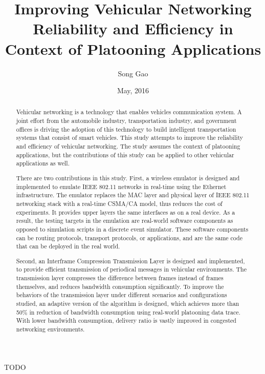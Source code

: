 \documentclass[12pt]{report}
\title{Improving Vehicular Networking Reliability and Efficiency in Context of Platooning Applications}
\author{Song Gao}
\date{May, 2016} %
\begin{document}
\begin{romanpages}      %

\TitlePage

\begin{abstract} 
  Vehicular networking is a technology that enables vehicles communication system. A joint effort from the automobile industry, transportation industry, and government offices is driving the adoption of this technology to build intelligent transportation systems that consist of smart vehicles. This study attempts to improve the reliability and efficiency of vehicular networking. The study assumes the context of platooning applications, but the contributions of this study can be applied to other vehicular applications as well.

  There are two contributions in this study. First, a wireless emulator is designed and implemented to emulate IEEE 802.11 networks in real-time using the Ethernet infrastructure. The emulator replaces the MAC layer and physical layer of IEEE 802.11 networking stack with a real-time CSMA/CA model, thus reduces the cost of experiments. It provides upper layers the same interfaces as on a real device. As a result, the testing targets in the emulation are real-world software components as opposed to simulation scripts in a discrete event simulator. These software components can be routing protocols, transport protocols, or applications, and are the same code that can be deployed in the real world.

  Second, an Interframe Compression Transmission Layer is designed and implemented, to provide efficient transmission of periodical messages in vehicular environments. The transmission layer compresses the difference between frames instead of frames themselves, and reduces bandwidth consumption significantly. To improve the behaviors of the transmission layer under different scenarios and configurations studied, an adaptive version of the algorithm is designed, which achieves more than 50\% in reduction of bandwidth consumption using real-world platooning data trace. With lower bandwidth consumption, delivery ratio is vastly improved in congested networking environments.
\end{abstract}

\begin{acknowledgments}
  TODO
\end{acknowledgments}


\tableofcontents
\listoffigures
\listoftables

\printnomenclature[1.0in] %
\end{romanpages}        %
\end{document}
